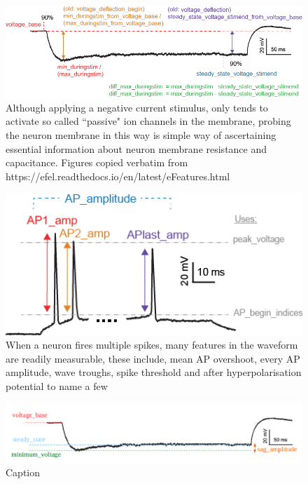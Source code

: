 \begin{figure}
    \centering
    \includegraphics{figures/voltage_features.png}
    \caption[passive membrane properties probed with a negative amplitude current stimulus]{Although applying a negative current stimulus, only tends to activate so called ``passive" ion channels in the membrane, probing the neuron membrane in this way is simple way of ascertaining essential information about neuron membrane resistance and capacitance.  Figures  copied verbatim from https://efel.readthedocs.io/en/latest/eFeatures.html}
    \label{fig:voltage_figures}
\end{figure}





\begin{figure}
    \centering
    \includegraphics{figures/AP_Amplitude.png}
    \caption[]{When a neuron fires multiple spikes, many features in the waveform are readily measurable, these include, mean AP overshoot, every AP amplitude, wave troughs, spike threshold and after hyperpolarisation potential to name a few}
    \label{fig:features_example}
\end{figure}

\begin{figure}
    \centering
    \includegraphics{figures/sag_amplitude}
    \caption{Caption}
    \label{fig:sag_amplitude}
\end{figure}


